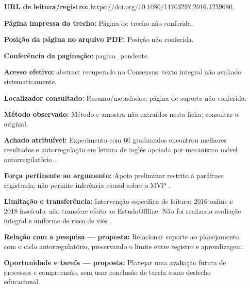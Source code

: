 \noindent\textbf{URL de leitura/registro:} \url{https://doi.org/10.1080/14703297.2016.1259080}.\par\medskip

\noindent\textbf{Página impressa do trecho:} Página do trecho não conferida.\par\medskip

\noindent\textbf{Posição da página no arquivo PDF:} Posição não conferida.\par\medskip

\noindent\textbf{Conferência da paginação:} pagina\_pendente.\par\medskip

\noindent\textbf{Acesso efetivo:} abstract recuperado no Consensus; texto integral não avaliado sistematicamente.\par\medskip

\noindent\textbf{Localizador consultado:} Resumo/metadados; página de suporte não conferida.\par\medskip

\noindent\textbf{Método observado:} Método e amostra não extraídos nesta ficha; consultar o original.\par\medskip

\noindent\textbf{Achado atribuível:} Experimento com 60 graduandos encontrou melhores resultados e autorregulação em leitura de inglês apoiada por mecanismo móvel autorregulatório \citep{education_zheng2016}.\par\medskip

\noindent\textbf{Força pertinente ao argumento:} Apoio preliminar restrito à paráfrase registrada; não permite inferência causal sobre o MVP \citep{education_zheng2016}.\par\medskip

\noindent\textbf{Limitação e transferência:} Intervenção específica de leitura; 2016 online e 2018 fascículo; não transfere efeito ao EstudaOffline. Não foi realizada avaliação integral e uniforme de risco de viés \citep{education_zheng2016}.\par\medskip

\noindent\textbf{Relação com a pesquisa — proposta:} Relacionar suporte ao planejamento com o ciclo autorregulatório, preservando o limite entre registro e aprendizagem.\par\medskip

\noindent\textbf{Oportunidade e tarefa — proposta:} Planejar uma avaliação futura de processos e compreensão, sem usar conclusão de tarefa como desfecho educacional.\par\medskip

